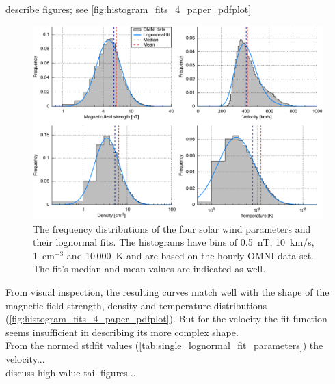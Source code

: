 describe figures; see \autoref{fig:histogram_fits_4_paper_pdfplot}
\begin{figure}[htb]
	\centering
	\includegraphics[width=1\textwidth]{images/gnuplots/histogram_fits_4_paper_pdfplot.pdf}
	\caption{The frequency distributions of the four solar wind parameters and their lognormal fits. The histograms have bins of 0.5~nT, 10~km/s, 1~cm$^{-3}$ and 10\,000~K and are based on the hourly OMNI data set. The fit's median and mean values are indicated as well.}
	\label{fig:histogram_fits_4_paper_pdfplot}
\end{figure}

From visual inspection, the resulting curves match well with the shape of the magnetic field strength, density and temperature distributions (\autoref{fig:histogram_fits_4_paper_pdfplot}). But for the velocity the fit function seems insufficient in describing its more complex shape.\\
From the normed stdfit values (\autoref{tab:single_lognormal_fit_parameters}) the velocity...\\

discuss high-value tail figures...\\




